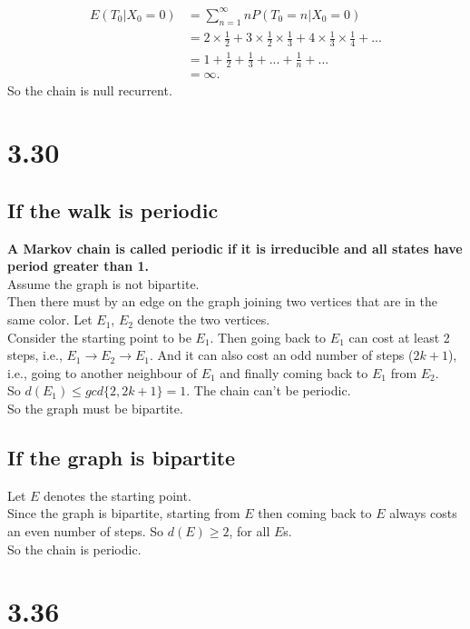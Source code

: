 \documentclass{article}
\begin{document}
\subsection{}
\begin{align*}
    E(T_0|X_0=0)&=\sum_{n=1}^\infty nP(T_0 = n|X_0=0)\\
    &=2 \times \frac{1}{2} + 3\times \frac{1}{2}\times \frac{1}{3}+ 4\times \frac{1}{3} \times \frac{1}{4}+...\\
    &= 1+\frac{1}{2}+\frac{1}{3}+ ...+\frac{1}{n}+... \\
    &= \infty.
\end{align*}
So the chain is null recurrent. 
\section{3.30}
\subsection{If the walk is periodic}
\textbf{A Markov chain is called periodic if it is irreducible and all states have period greater than 1.}\\
Assume the graph is not bipartite. \\
Then there must by an edge on the graph joining two vertices that are in the same color. Let $E_1$, $E_2$ denote the two vertices. \\
Consider the starting point to be $E_1$. Then going back to $E_1$ can cost at least 2 steps, i.e., $E_1 \to E_2 \to E_1$. And it can also cost an odd number of steps ($2k+1$), i.e., going to another neighbour of $E_1$ and finally coming back to $E_1$ from $E_2$. \\
So $d(E_1) \leq gcd\{2, 2k+1\}=1.$ The chain can't be periodic. \\
So the graph must be bipartite.
\subsection{If the graph is bipartite}
Let $E$ denotes the starting point. \\
Since the graph is bipartite, starting from $E$ then coming back to $E$ always costs an even number of steps. So $d(E) \geq 2$, for all $E$s. \\
So the chain is periodic. 
\section{3.36}
\end{document}
